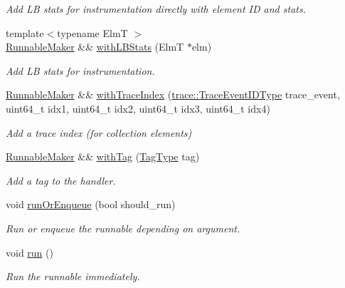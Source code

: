 \begin{DoxyCompactItemize}
\begin{DoxyCompactList}\small\item\em Add LB stats for instrumentation directly with element ID and stats. \end{DoxyCompactList}\item 
{\footnotesize template$<$typename ElmT $>$ }\\\hyperlink{structvt_1_1runnable_1_1_runnable_maker}{Runnable\+Maker} \&\& \hyperlink{structvt_1_1runnable_1_1_runnable_maker_a2d59781f97ad319ceefcde673339364c}{with\+L\+B\+Stats} (ElmT $\ast$elm)
\begin{DoxyCompactList}\small\item\em Add LB stats for instrumentation. \end{DoxyCompactList}\item 
\hyperlink{structvt_1_1runnable_1_1_runnable_maker}{Runnable\+Maker} \&\& \hyperlink{structvt_1_1runnable_1_1_runnable_maker_a37eb87c4f7d045cfa5ff7e11d9082dd3}{with\+Trace\+Index} (\hyperlink{namespacevt_1_1trace_a64a7185f3e102df8d8258f263ccd1582}{trace\+::\+Trace\+Event\+I\+D\+Type} trace\+\_\+event, uint64\+\_\+t idx1, uint64\+\_\+t idx2, uint64\+\_\+t idx3, uint64\+\_\+t idx4)
\begin{DoxyCompactList}\small\item\em Add a trace index (for collection elements) \end{DoxyCompactList}\item 
\hyperlink{structvt_1_1runnable_1_1_runnable_maker}{Runnable\+Maker} \&\& \hyperlink{structvt_1_1runnable_1_1_runnable_maker_a3a22a3b3952eb54f07e610000f833d7e}{with\+Tag} (\hyperlink{namespacevt_a84ab281dae04a52a4b243d6bf62d0e52}{Tag\+Type} tag)
\begin{DoxyCompactList}\small\item\em Add a tag to the handler. \end{DoxyCompactList}\item 
void \hyperlink{structvt_1_1runnable_1_1_runnable_maker_aa0ae94d80e43385c18ee1e2afbce59a2}{run\+Or\+Enqueue} (bool should\+\_\+run)
\begin{DoxyCompactList}\small\item\em Run or enqueue the runnable depending on argument. \end{DoxyCompactList}\item 
void \hyperlink{structvt_1_1runnable_1_1_runnable_maker_a8fb3e1362dd6f746e991786654f5bd40}{run} ()
\begin{DoxyCompactList}\small\item\em Run the runnable immediately. \end{DoxyCompactList}\item 

\end{DoxyCompactItemize}
